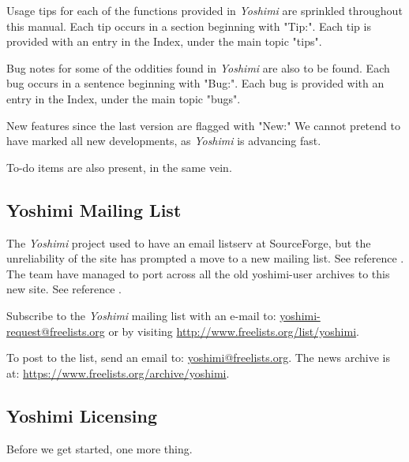 \documentclass[
 11pt,
 twoside,
 a4paper,
 final                                 %
]{article}
\begin{document}
   Usage tips
   for each of the functions provided in
   \textsl{Yoshimi} are sprinkled throughout this manual.
   Each tip occurs in a section beginning with "Tip:".
   Each tip is provided with an entry in the Index, under the
   main topic "tips".

   Bug notes for some of the oddities found in \textsl{Yoshimi} are also to be
   found.  Each bug occurs in a sentence beginning with "Bug:".  Each bug is
   provided with an entry in the Index, under the main topic "bugs".

   New features
   since the last version are flagged with "New:"  We cannot pretend to have
   marked all new developments, as \textsl{Yoshimi} is advancing fast.

   To-do items are also present, in the same vein.

\subsection{Yoshimi Mailing List}
\label{subsec:introduction_mailing_list}

   The \textsl{Yoshimi} project used to have an email listserv at
   SourceForge, but the unreliability of the site has prompted a move to a
   new mailing list.  See reference \cite{yoshiminews}.  The team have
   managed to port across all the old yoshimi-user archives to this new
   site.  See reference \cite{yoshiminewsarchive}.

   Subscribe to the \textsl{Yoshimi} mailing list with an e-mail to:
   \url{yoshimi-request@freelists.org} or by visiting 
   \url{http://www.freelists.org/list/yoshimi}.

   To post to the list, send an email to: \url{yoshimi@freelists.org}.
   The news archive is at: \url{https://www.freelists.org/archive/yoshimi}.

\subsection{Yoshimi Licensing}
\label{subsec:introduction_yoshimi_licensing}

   Before we get started, one more thing.
\end{document}
